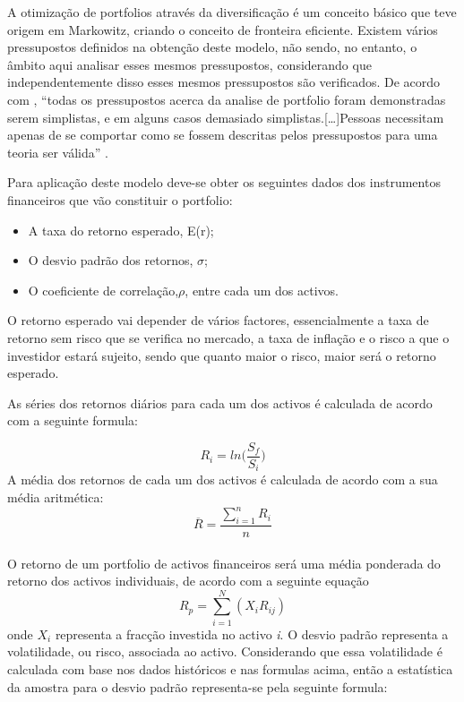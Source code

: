 \documentclass[
  12pt,
  a4paper,
  openany]{book}
\providecommand{\tightlist}{%
  \setlength{\itemsep}{0pt}\setlength{\parskip}{0pt}}
\begin{document}
A otimização de portfolios através da diversificação é um conceito básico que teve origem em Markowitz, criando o conceito de fronteira eficiente. Existem vários pressupostos definidos na obtenção deste modelo, não sendo, no entanto, o âmbito aqui analisar esses mesmos pressupostos, considerando que independentemente disso esses mesmos pressupostos são verificados. De acordo com \citet{Modern2013}, ``todas os pressupostos acerca da analise de portfolio foram demonstradas serem simplistas, e em alguns casos demasiado simplistas.{[}\ldots{]}Pessoas necessitam apenas de se comportar como se fossem descritas pelos pressupostos para uma teoria ser válida'' \citep[pp.5]{Modern2013}.

Para aplicação deste modelo deve-se obter os seguintes dados dos instrumentos financeiros que vão constituir o portfolio:

\begin{itemize}
\tightlist
\item
  A taxa do retorno esperado, E(r);
\item
  O desvio padrão dos retornos, \(\sigma\);
\item
  O coeficiente de correlação,\(\rho\), entre cada um dos activos.
\end{itemize}

O retorno esperado vai depender de vários factores, essencialmente a taxa de retorno sem risco que se verifica no mercado, a taxa de inflação e o risco a que o investidor estará sujeito, sendo que quanto maior o risco, maior será o retorno esperado.

As séries dos retornos diários para cada um dos activos é calculada de acordo com a seguinte formula:

\begin{equation} 
  R_i = ln\Big(\frac{S_f}{S_i}\Big)
  \label{eq:logRet}
\end{equation}
A média dos retornos de cada um dos activos é calculada de acordo com a sua média aritmética:
\begin{equation} 
  \overline{R} = \frac{\displaystyle\sum_{i=1}^n R_i}{n}
  \label{eq:meanRet}
\end{equation}\\
O retorno de um portfolio de activos financeiros será uma média ponderada do retorno dos activos individuais, de acordo com a seguinte equação
\begin{equation} 
    R_{p} = \sum_{i=1}^{N}(X_{i}R_{ij})
  \label{eq:retp}
\end{equation}
onde \(X_{i}\) representa a fracção investida no activo \emph{i}.
O desvio padrão representa a volatilidade, ou risco, associada ao activo. Considerando que essa volatilidade é calculada com base nos dados históricos e nas formulas acima, então a estatística da amostra para o desvio padrão representa-se pela seguinte formula:
\end{document}

